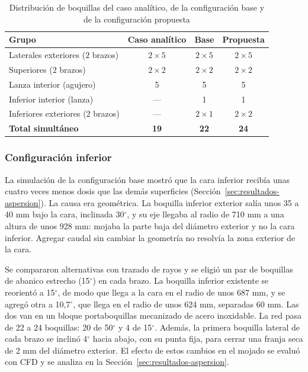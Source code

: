 \begin{table}[htbp]
\centering\small\singlespacing
\caption{Distribución de boquillas del caso analítico, de la configuración base y de la configuración propuesta}
\label{tab:boquillas-grupos}
\begin{tabular}{@{}lccc@{}}
\toprule
\textbf{Grupo} & \textbf{Caso analítico} & \textbf{Base} & \textbf{Propuesta}\\
\midrule
Laterales exteriores ($2$ brazos) & $2\times5$ & $2\times5$ & $2\times5$\\
Superiores ($2$ brazos) & $2\times2$ & $2\times2$ & $2\times2$\\
Lanza interior (agujero) & 5 & 5 & 5\\
Inferior interior (lanza) & --- & 1 & 1\\
Inferiores exteriores (2 brazos) & --- & $2\times1$ & $2\times2$\\
\midrule
\textbf{Total simultáneo} & \textbf{19} & \textbf{22} & \textbf{24}\\
\bottomrule
\end{tabular}
\end{table}

\subsubsection{Configuración inferior}
\label{sec:configuracion-inferior}

La simulación de la configuración base mostró que la cara inferior recibía unas cuatro veces menos dosis que las demás superficies (Sección~\ref{sec:resultados-aspersion}). La causa era geométrica. La boquilla inferior exterior salía unos 35 a 40 mm bajo la cara, inclinada 30$^\circ$, y su eje llegaba al radio de 710 mm a una altura de unos 928 mm: mojaba la parte baja del diámetro exterior y no la cara inferior. Agregar caudal sin cambiar la geometría no resolvía la zona exterior de la cara.

Se compararon alternativas con trazado de rayos y se eligió un par de boquillas de abanico estrecho (15$^\circ$) en cada brazo. La boquilla inferior existente se reorientó a 15$^\circ$, de modo que llega a la cara en el radio de unos 687 mm, y se agregó otra a 10,7$^\circ$, que llega en el radio de unos 624 mm, separadas 60 mm. Las dos van en un bloque portaboquillas mecanizado de acero inoxidable. La red pasa de 22 a 24 boquillas: 20 de 50$^\circ$ y 4 de 15$^\circ$. Además, la primera boquilla lateral de cada brazo se inclinó 4$^\circ$ hacia abajo, con su punta fija, para cerrar una franja seca de 2 mm del diámetro exterior. El efecto de estos cambios en el mojado se evaluó con CFD y se analiza en la Sección~\ref{sec:resultados-aspersion}.

